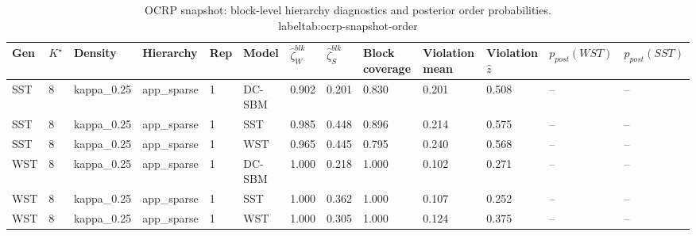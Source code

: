 \begin{table}[!h]
\centering
\caption{OCRP snapshot: block-level hierarchy diagnostics and posterior order probabilities.\\label{tab:ocrp-snapshot-order}}
\centering
\begin{tabular}[t]{lllllllllllll}
\toprule
Gen & $K^\star$ & Density & Hierarchy & Rep & Model & $\widehat\zeta_W^{blk}$ & $\widehat\zeta_S^{blk}$ & Block coverage & Violation mean & Violation $\hat z$ & $p_{post}(WST)$ & $p_{post}(SST)$\\
\midrule
SST & 8 & kappa_0.25 & app_sparse & 1 & DC-SBM & 0.902 & 0.201 & 0.830 & 0.201 & 0.508 & -- & --\\
SST & 8 & kappa_0.25 & app_sparse & 1 & SST & 0.985 & 0.448 & 0.896 & 0.214 & 0.575 & -- & --\\
SST & 8 & kappa_0.25 & app_sparse & 1 & WST & 0.965 & 0.445 & 0.795 & 0.240 & 0.568 & -- & --\\
WST & 8 & kappa_0.25 & app_sparse & 1 & DC-SBM & 1.000 & 0.218 & 1.000 & 0.102 & 0.271 & -- & --\\
WST & 8 & kappa_0.25 & app_sparse & 1 & SST & 1.000 & 0.362 & 1.000 & 0.107 & 0.252 & -- & --\\
WST & 8 & kappa_0.25 & app_sparse & 1 & WST & 1.000 & 0.305 & 1.000 & 0.124 & 0.375 & -- & --\\
\bottomrule
\end{tabular}
\end{table}
